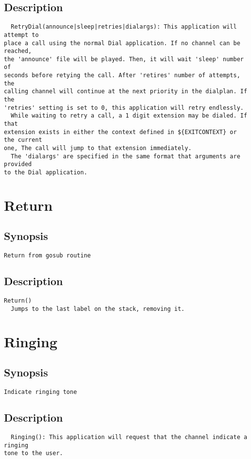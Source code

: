 \subsection{Description}
\begin{verbatim}
  RetryDial(announce|sleep|retries|dialargs): This application will attempt to
place a call using the normal Dial application. If no channel can be reached,
the 'announce' file will be played. Then, it will wait 'sleep' number of
seconds before retying the call. After 'retires' number of attempts, the
calling channel will continue at the next priority in the dialplan. If the
'retries' setting is set to 0, this application will retry endlessly.
  While waiting to retry a call, a 1 digit extension may be dialed. If that
extension exists in either the context defined in ${EXITCONTEXT} or the current
one, The call will jump to that extension immediately.
  The 'dialargs' are specified in the same format that arguments are provided
to the Dial application.

\end{verbatim}


\section{Return}
\subsection{Synopsis}
\begin{verbatim}
Return from gosub routine
\end{verbatim}
\subsection{Description}
\begin{verbatim}
Return()
  Jumps to the last label on the stack, removing it.

\end{verbatim}


\section{Ringing}
\subsection{Synopsis}
\begin{verbatim}
Indicate ringing tone
\end{verbatim}
\subsection{Description}
\begin{verbatim}
  Ringing(): This application will request that the channel indicate a ringing
tone to the user.

\end{verbatim}


